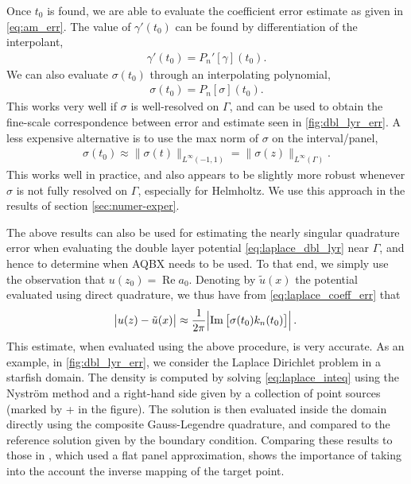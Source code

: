 \documentclass[hidelinks]{siamart1116}
\begin{document}
Once $t_0$ is found, we are able to evaluate the coefficient error
estimate as given in \eqref{eq:am_err}. The value of ${\gamma}'(t_0)$
can be found by differentiation of the interpolant,
\begin{align}
  {\gamma}'(t_0) = P_n'[\gamma](t_0) .
\end{align}
We can also evaluate ${{\sigma}}(t_0)$ through an interpolating polynomial,
\begin{align}
  {{\sigma}}(t_0) = P_n[{{\sigma}}](t_0).
  \label{eq:den_t0_extrap}
\end{align}
This works very well if ${\sigma}$ is well-resolved on $\Gamma$, and can
be used to obtain the fine-scale correspondence between error and
estimate seen in \cref{fig:dbl_lyr_err}. A less expensive
alternative is to use the max norm of ${{\sigma}}$ on the
interval/panel,
\begin{align}
  {{\sigma}}(t_0) \approx \| {{\sigma}}(t) \|_{L^\infty(-1, 1)} 
  = \|   {\sigma}(z) \|_{L^\infty(\Gamma)}.
  \label{eq:den_t0_max}
\end{align}
This works well in practice, and also appears to be slightly more
robust whenever ${\sigma}$ is not fully resolved on $\Gamma$, especially
for Helmholtz. We use this approach in the results of section
\ref{sec:numer-exper}.

The above results can also be used for estimating the nearly singular
quadrature error when evaluating the double layer potential
\eqref{eq:laplace_dbl_lyr} near $\Gamma$, and hence to determine when
AQBX needs to be used. To that end, we simply use the observation that
$u(z_0) = {\operatorname{Re}} {a}_0$. Denoting by $\tilde u(x)$ the potential
evaluated using direct quadrature, we thus have from
\eqref{eq:laplace_coeff_err} that
\begin{align}
  \abs{u(z) - \tilde u(x)} \approx
  \frac{1}{2\pi} \abs{{\operatorname{Im}} \left[{{\sigma}}(t_0) k_n(t_0)\right]} .
  
  \label{eq:dbl_lyr_err}
\end{align}
This estimate, when evaluated using the above procedure, is very
accurate. As an example, in  \cref{fig:dbl_lyr_err}, we consider
the Laplace Dirichlet problem in a starfish domain. The density is
computed by solving \eqref{eq:laplace_inteq} using the Nystr\"om
method and a right-hand side given by a collection of point sources
(marked by + in the figure). The solution is then evaluated inside the
domain directly using the composite Gauss-Legendre quadrature, and
compared to the reference solution given by the boundary
condition. Comparing these results to those in
\cite[fig. 7]{AfKlinteberg2016quad}, which used a flat panel
approximation, shows the importance of taking into the account the
inverse mapping of the target point.
\end{document}

